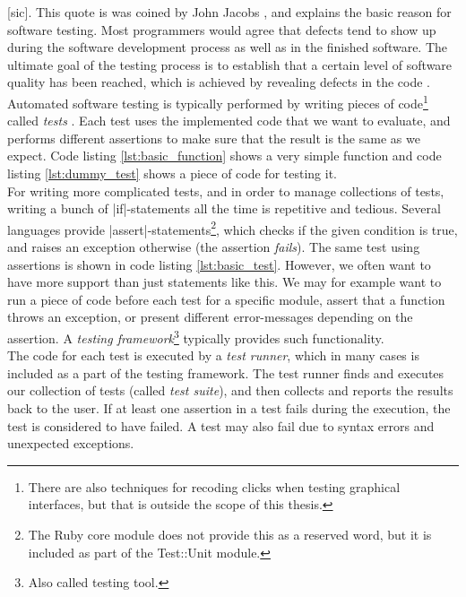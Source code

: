 \MakeShortVerb{\|}

 [sic].
This quote is was coined by John Jacobs \cite{web:quote_jacobs}, and
explains the basic reason for software testing. Most programmers would
agree that defects tend to show up during the software development
process as well as in the finished software. The ultimate goal of the
testing process is to establish that a certain level of software quality
has been reached, which is achieved by revealing defects in the code
\cite{book:adp}.\\

Automated software testing is typically performed by writing pieces of
code\footnote{There are also techniques for recoding clicks when testing
graphical interfaces, but that is outside the scope of this thesis.}
called \emph{tests} \cite{wiki:test_automation}. Each test uses the
implemented code that we want to evaluate, and performs different
assertions to make sure that the result is the same as we expect. Code
listing \ref{lst:basic_function} shows a very simple function and code
listing \ref{lst:dummy_test} shows a piece of code for testing it.\\

For writing more complicated tests, and in order to manage collections
of tests, writing a bunch of |if|-statements all the time is repetitive
and tedious. Several languages provide |assert|-statements\footnote{The
Ruby core module does not provide this as a reserved word, but it is
included as part of the Test::Unit module.}, which checks if the given
condition is true, and raises an exception otherwise (the assertion
\emph{fails}). The same test using assertions is shown in code listing
\ref{lst:basic_test}. However, we often want to have more support than
just statements like this. We may for example want to run a piece of
code before each test for a specific module, assert that a function
throws an exception, or present different error-messages depending on
the assertion. A \emph{testing framework}\footnote{Also called testing
tool.} typically provides such
functionality. \cite{wiki:test_automation}\\

The code for each test is executed by a \emph{test runner}, which in
many cases is included as a part of the testing framework. The test
runner finds and executes our collection of tests (called \emph{test
suite}), and then collects and reports the results back to the user. If
at least one assertion in a test fails during the execution, the test is
considered to have failed. A test may also fail due to syntax errors and
unexpected exceptions.\\


